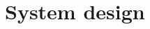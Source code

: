 \section{System design}
\begin{comment}
	Draw an UML package diagram for the top level for all components that you have
	identified above (which can be just one if you develop a standalone application).
	Describe the interfaces and dependencies between the packages. Describe how you
	have implemented the MVC design pattern.

	Create an UML class diagram for every package. One of the packages will contain
	the model of your application. This will be the design model of your
	application, describe in detail the relation between your domain model and your
	design model. There should be a clear and logical relation between the two. Make
	sure that these models stay in `sync' during the development of your application.

	Describe which (if any) design patterns you have used.

	The above describes the static design of your application. It may sometimes be
	necessary to describe the \emph{dynamic} design of your application as well. You
	can use an UML \emph{sequence diagram} to show the different parts of your
	application communicate an in what order.
\end{comment}
